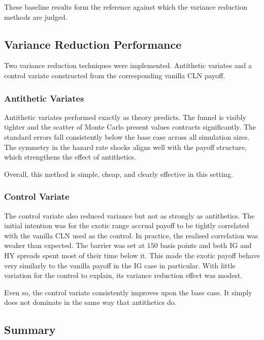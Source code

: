 These baseline results form the reference against which the variance reduction methods are judged.



\subsection{Variance Reduction Performance}

Two variance reduction techniques were implemented. Antithetic variates and a control variate constructed from the corresponding vanilla CLN payoff.

\subsubsection{Antithetic Variates}

Antithetic variates performed exactly as theory predicts. The funnel is visibly tighter and the scatter of Monte Carlo present values contracts significantly. The standard errors fall consistently below the base case across all simulation sizes. The symmetry in the hazard rate shocks aligns well with the payoff structure, which strengthens the effect of antithetics.

Overall, this method is simple, cheap, and clearly effective in this setting.

\subsubsection{Control Variate}

The control variate also reduced variance but not as strongly as antithetics. The initial intention was for the exotic range accrual payoff to be tightly correlated with the vanilla CLN used as the control. In practice, the realised correlation was weaker than expected. The barrier was set at \(150\) basis points and both IG and HY spreads spent most of their time below it. This made the exotic payoff behave very similarly to the vanilla payoff in the IG case in particular. With little variation for the control to explain, its variance reduction effect was modest.

Even so, the control variate consistently improves upon the base case. It simply does not dominate in the same way that antithetics do.

\subsection{Summary}

